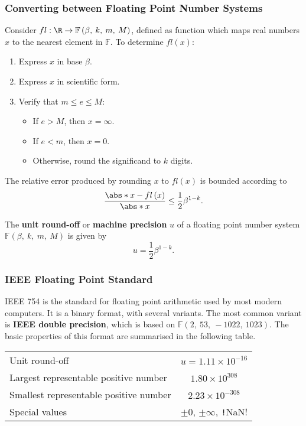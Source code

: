 \documentclass{article}
\begin{document}
\subsubsection{Converting between Floating Point Number Systems}
Consider \(fl : \R \to \mathbb{F}\left( \beta,\: k,\: m,\: M \right)\),
defined as function which maps real numbers \(x\) to the nearest
element in \(\mathbb{F}\). To determine \(fl\left( x \right)\):
\begin{enumerate}
    \item Express \(x\) in base \(\beta\).
    \item Express \(x\) in scientific form.
    \item Verify that \(m \leq e \leq M\):
          \begin{itemize}
              \item If \(e > M\), then \(x = \infty\).
              \item If \(e < m\), then \(x = 0\).
              \item Otherwise, round the significand to \(k\) digits.
          \end{itemize}
\end{enumerate}
The relative error produced by rounding \(x\) to \(fl\left( x \right)\)
is bounded according to
\begin{equation*}
    \frac{\abs*{x - fl\left( x \right)}}{\abs*{x}} \leq \frac{1}{2} \beta^{1 - k}.
\end{equation*}
\begin{definition}
    The \textbf{unit round-off} or \textbf{machine precision} \(u\) of a
    floating point number system
    \(\mathbb{F}\left( \beta,\: k,\: m,\: M \right)\) is given by
    \begin{equation*}
        u = \frac{1}{2} \beta^{1 - k}.
    \end{equation*}
\end{definition}
\subsubsection{IEEE Floating Point Standard}
IEEE 754 is the standard for floating point arithmetic used by most
modern computers. It is a binary format, with several variants. The
most common variant is \textbf{IEEE double precision}, which is based
on \(\mathbb{F}\left( 2,\: 53,\: -1022,\: 1023 \right)\). The basic
properties of this format are summarised in the following table.
\begin{table}[H]
    \centering
    \begin{tabular}{l | c}
        \toprule
        Unit round-off                          & \(u = 1.11 \times 10^{-16}\)                      \\
        Largest representable positive number  & \(1.80 \times 10^{308}\)                          \\
        Smallest representable positive number & \(2.23 \times 10^{-308}\)                         \\
        Special values                         & \(\pm 0\), \(\pm \infty\), \texttt!NaN! \\
        \bottomrule
    \end{tabular}
\end{table}
\end{document}
